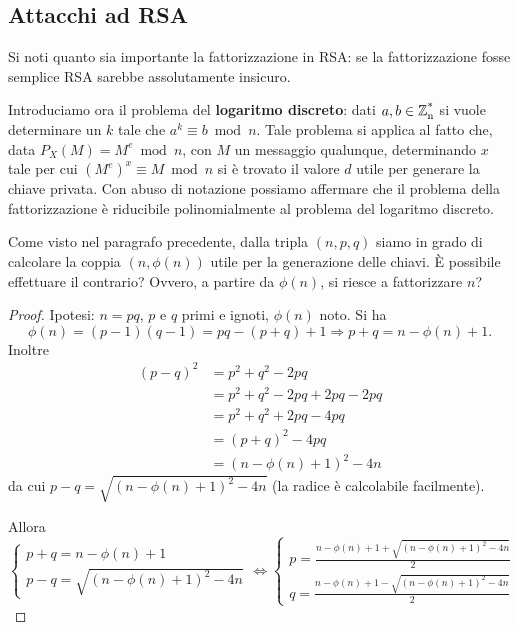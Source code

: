 \subsection{Attacchi ad RSA}
Si noti quanto sia importante la fattorizzazione in RSA: se la fattorizzazione fosse semplice RSA sarebbe assolutamente insicuro. 

Introduciamo ora il problema del \textbf{logaritmo discreto}: dati $a,b\in\operatorname*{\mathbb{Z}_n^*}$ si vuole determinare un $k$ tale che $a^k\equiv b\bmod n$. Tale problema si applica al fatto che, data $P_X(M)=M^e\bmod n$, con $M$ un messaggio qualunque, determinando $x$ tale per cui $(M^e)^x\equiv M\bmod n$ si è trovato il valore $d$ utile per generare la chiave privata. Con abuso di notazione possiamo affermare che il problema della fattorizzazione è riducibile polinomialmente al problema del logaritmo discreto.

Come visto nel paragrafo precedente, dalla tripla $(n,p,q)$ siamo in grado di calcolare la coppia $(n,\phi(n))$ utile per la generazione delle chiavi. È possibile effettuare il contrario? Ovvero, a partire da $\phi(n)$, si riesce a fattorizzare $n$?
\begin{proof}
Ipotesi: $n=pq$, $p$ e $q$ primi e ignoti, $\phi(n)$ noto.
Si ha
\[
\phi(n)=(p-1)(q-1)=pq-(p+q)+1 \Rightarrow p+q=n-\phi(n)+1.
\]
Inoltre
\begin{align*}
(p-q)^2&=p^2+q^2-2pq \\
&=p^2+q^2-2pq+2pq-2pq \\
&=p^2+q^2+2pq -4pq \\
&=(p+q)^2-4pq \\
&=(n-\phi(n)+1)^2-4n
\end{align*}
da cui $p-q=\sqrt{(n-\phi(n)+1)^2-4n}$ (la radice è calcolabile facilmente).

Allora
\[
\begin{cases}
p+q=n-\phi(n)+1 \\
p-q=\sqrt{(n-\phi(n)+1)^2-4n}
\end{cases}
\Leftrightarrow 
\begin{cases}
p=\frac{n-\phi(n)+1+\sqrt{(n-\phi(n)+1)^2-4n}}{2} \\
q=\frac{n-\phi(n)+1-\sqrt{(n-\phi(n)+1)^2-4n}}{2}
\end{cases}
\]
\end{proof}

